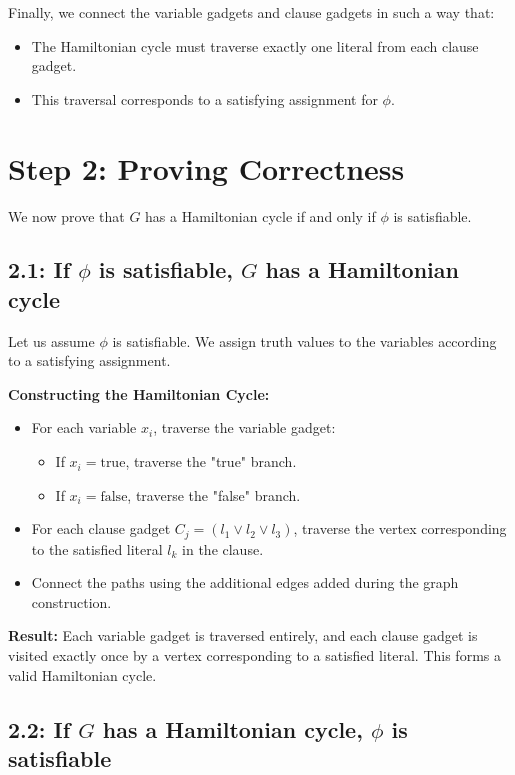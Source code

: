 \documentclass[10pt,letter,notitlepage]{article}
\begin{document}
\begin{Answer}
Finally, we connect the variable gadgets and clause gadgets in such a way that:

\begin{itemize}
    \item The Hamiltonian cycle must traverse exactly one literal from each clause gadget.
    \item This traversal corresponds to a satisfying assignment for \(\phi\).
\end{itemize}

\section*{Step 2: Proving Correctness}

We now prove that \(G\) has a Hamiltonian cycle if and only if \(\phi\) is satisfiable.

\subsection*{2.1: If \(\phi\) is satisfiable, \(G\) has a Hamiltonian cycle}

Let us assume \(\phi\) is satisfiable. We assign truth values to the variables according to a satisfying assignment.

\textbf{Constructing the Hamiltonian Cycle:}

\begin{itemize}
    \item For each variable \(x_i\), traverse the variable gadget:
    \begin{itemize}
        \item If \(x_i = \text{true}\), traverse the "true" branch.
        \item If \(x_i = \text{false}\), traverse the "false" branch.
    \end{itemize}
    \item For each clause gadget \(C_j = (l_1 \lor l_2 \lor l_3)\), traverse the vertex corresponding to the satisfied literal \(l_k\) in the clause.
    \item Connect the paths using the additional edges added during the graph construction.
\end{itemize}

\textbf{Result:}
Each variable gadget is traversed entirely, and each clause gadget is visited exactly once by a vertex corresponding to a satisfied literal. This forms a valid Hamiltonian cycle.

\subsection*{2.2: If \(G\) has a Hamiltonian cycle, \(\phi\) is satisfiable}


\end{Answer}
\end{document}
